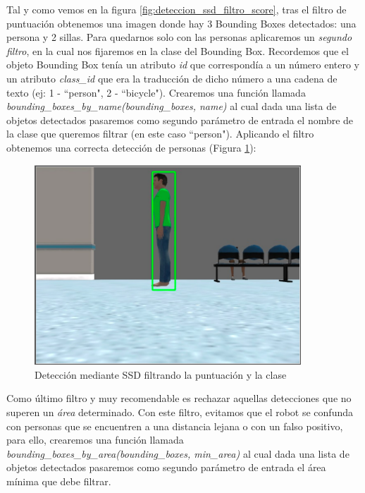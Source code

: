 Tal y como vemos en la figura \ref{fig:deteccion_ssd_filtro_score}, tras el filtro de puntuación obtenemos una imagen donde hay 3 Bounding Boxes detectados: una persona y 2 sillas. Para quedarnos solo con las personas aplicaremos un \textit{segundo filtro}, en la cual nos fijaremos en la clase del Bounding Box. Recordemos que el objeto Bounding Box tenía un atributo \textit{id} que correspondía a un número entero y un atributo \textit{class\_id} que era la traducción de dicho número a una cadena de texto (ej: 1 - ``person", 2 - ``bicycle"). Crearemos una función llamada \textit{bounding\_boxes\_by\_name(bounding\_boxes, name)} al cual dada una lista de objetos detectados pasaremos como segundo parámetro de entrada el nombre de la clase que queremos filtrar (en este caso ``person"). Aplicando el filtro obtenemos una correcta detección de personas (Figura \ref{fig:deteccion_ssd_filtro_score_class}):\\

\begin{figure} [H]
  \begin{center}
    \includegraphics[width=10cm]{imagenes/deteccion-ssd-filtro-score-class.png}
  \end{center}
  \caption[Detección mediante SSD filtrando la puntuación y la clase]{Detección mediante SSD filtrando la puntuación y la clase}
  \label{fig:deteccion_ssd_filtro_score_class}
\end{figure}

Como último filtro y muy recomendable es rechazar aquellas detecciones que no superen un \textit{área} determinado. Con este filtro, evitamos que el robot se confunda con personas que se encuentren a una distancia lejana o con un falso positivo, para ello, crearemos una función llamada \textit{bounding\_boxes\_by\_area(bounding\_boxes, min\_area)} al cual dada una lista de objetos detectados pasaremos como segundo parámetro de entrada el área mínima que debe filtrar.\\

